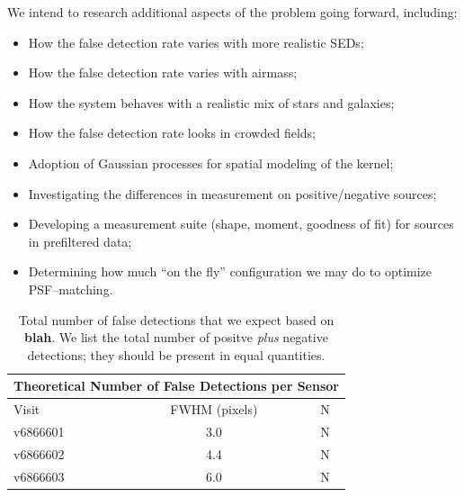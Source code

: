 \documentclass[prd, nofootinbib, floatfix, 11pt,tightenlines,times]{article}
\begin{document}
We intend to research additional aspects of the problem going forward,
including:
\begin{itemize}
\item How the false detection rate varies with more realistic SEDs;
\item How the false detection rate varies with airmass;
\item How the system behaves with a realistic mix of stars and galaxies;
\item How the false detection rate looks in crowded fields;
\item Adoption of Gaussian processes for spatial modeling of the kernel;
\item Investigating the differences in measurement on positive/negative sources;
\item Developing a measurement suite (shape, moment, goodness of fit) for sources in prefiltered data;
\item Determining how much ``on the fly'' configuration we may do to optimize PSF--matching.
\end{itemize}

\clearpage



\clearpage

\begin{table}
\centering
\begin{tabular}{lcc}
\hline
\multicolumn{3}{|c|}{Theoretical Number of False Detections per Sensor} \\
\hline
Visit    & FWHM (pixels) & N\\
\hline
v6866601 & 3.0 & N \\
v6866602 & 4.4 & N \\
v6866603 & 6.0 & N \\
\end{tabular}
\caption{Total number of false detections that we expect based on
  {\bf blah}.  We list the total number of positve {\it plus} negative detections;
  they should be present in equal quantities. \label{tab-fp}
}
\end{table}
\end{document}
